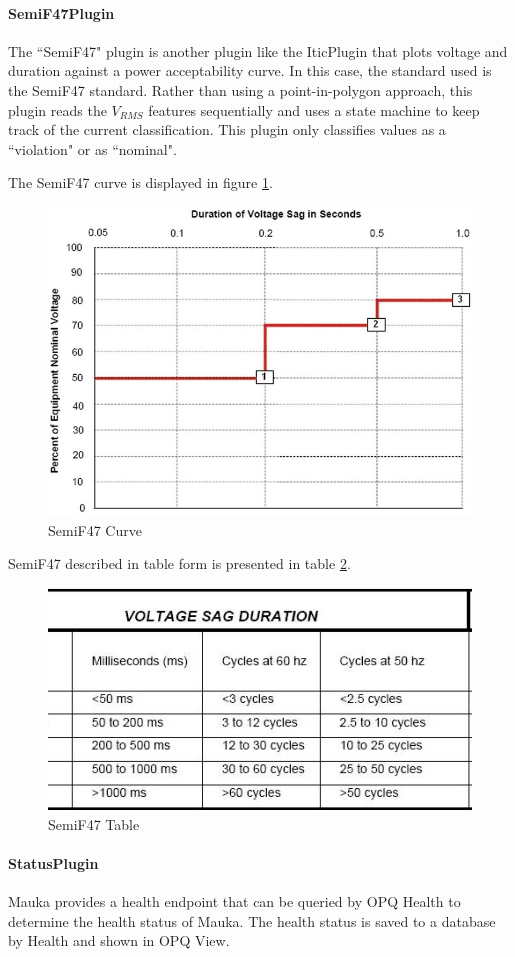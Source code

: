 \paragraph{SemiF47Plugin}
The ``SemiF47" plugin is another plugin like the IticPlugin that plots voltage and duration against a power acceptability curve. In this case, the standard used is the SemiF47 standard\cite{semif47}. Rather than using a point-in-polygon approach, this plugin reads the $V_{RMS}$ features sequentially and uses a state machine to keep track of the current classification. This plugin only classifies values as a ``violation" or as ``nominal".

The SemiF47 curve is displayed in figure \ref{fig:SemiF47Curve}.

\begin{figure}
	\centering
	\includegraphics[width=0.6\linewidth]{figures/semif47.jpg}
	\caption{SemiF47 Curve}
	\label{fig:SemiF47Curve}
\end{figure}

SemiF47 described in table form is presented in table \ref{fig:SemiF47Table}.

\begin{figure}
	\centering
	\includegraphics[width=0.6\linewidth]{figures/semif47_table.jpg}
	\caption{SemiF47 Table}
	\label{fig:SemiF47Table}
\end{figure}


\paragraph{StatusPlugin}
Mauka provides a health endpoint that can be queried by OPQ Health to determine the health status of Mauka. The health status is saved to a database by Health and shown in OPQ View.

